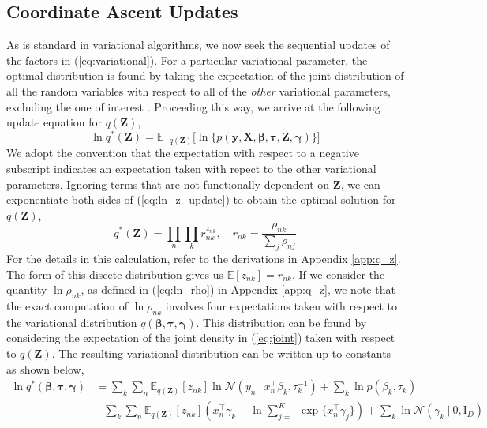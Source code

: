 \documentclass[twoside,11pt]{article}
\newcommand{\eye}{\mathrm{I}}
\newcommand\given[1][]{\:#1\vert\:}
\newcommand{\transpose}[1]{#1^{\intercal}}
\newcommand{\nsum}{\sum_{n}}
\newcommand{\ksum}{\sum_{k}}
\newcommand{\boldbeta}{\boldsymbol\beta}
\newcommand{\boldgamma}{\boldsymbol\gamma}
\newcommand{\boldtau}{\boldsymbol\tau}
\newcommand{\sumexp}{\sum_{j=1}^{K} \exp \{ \transpose{x_n} \gamma_j \}}
\newcommand{\E}{\mathbb{E}}
\newcommand{\pr}[1]{p \left( #1 \right)}
\begin{document}
\subsection{Coordinate Ascent Updates}

As is standard in variational algorithms, we now seek the sequential updates of the factors in (\ref{eq:variational}). For a particular variational parameter, the optimal distribution is found by taking the expectation of the joint distribution of all the random variables with respect to all of the \textit{other} variational parameters, excluding the one of interest \parencite{bishop:06}. Proceeding this way, we arrive at the following update equation for $q(\mathbf{Z})$,
\begin{equation} \label{eq:ln_z_update}
	\ln q^{*}(\mathbf{Z}) = \E_{-q(\mathbf{Z})} \Big[ \ln \big\{ \pr{\mathbf{y}, \mathbf{X}, \boldbeta, \boldtau, \mathbf{Z}, \boldgamma} \big\} \Big]
\end{equation}
We adopt the convention that the expectation with respect to a negative subscript indicates an expectation taken with repect to the other variational parameters. Ignoring terms that are not functionally dependent on $\mathbf{Z}$, we can exponentiate both sides of (\ref{eq:ln_z_update}) to obtain the optimal solution for $q(\mathbf{Z})$,
\begin{equation} \label{optimal_z}
	 q^{*}(\mathbf{Z}) = \prod_{n} \prod_{k} r_{nk}^{z_{nk}}, \quad r_{nk} = \frac{\rho_{nk}}{\sum_{j} \rho_{nj}}
\end{equation}
For the details in this calculation, refer to the derivations in Appendix \ref{app:q_z}. The form of this discete distribution gives us $\E[z_{nk}] = r_{nk}$. If we consider the quantity $\ln \rho_{nk}$, as defined in (\ref{eq:ln_rho}) in Appendix \ref{app:q_z}, we note that the exact computation of $\ln \rho_{nk}$ involves four expectations taken with respect to the variational distribution $q(\boldbeta, \boldtau, \boldgamma)$. This distribution can be found by considering the expectation of the joint density in (\ref{eq:joint}) taken with respect to $q(\mathbf{Z})$. The resulting variational distribution can be written up to constants as shown below,
\begin{equation} \label{eq:ln_beta_tau_gamma}
\begin{split}
	\ln q^{*}(\boldbeta, \boldtau, \boldgamma) &=  \ksum \nsum  \E_{q(\mathbf{Z})}[z_{nk}] \ln \mathcal{N} \left( y_n \given \transpose{x_n} \beta_k, \tau_{k}^{-1} \right) + \ksum \ln \pr{\beta_k, \tau_k} \\
	& + \ksum \nsum \E_{q(\mathbf{Z})}[z_{nk}] \left( \transpose{x_n} \gamma_k - \ln  \sumexp \right) + \ksum \ln \mathcal{N}(\gamma_k \given 0, \eye_D)
\end{split}
\end{equation}
\end{document}
